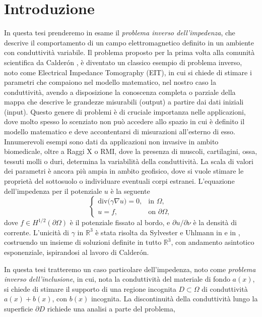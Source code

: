 \documentclass[10pt, a4paper, twoside, openright]{book}
\theoremstyle{definition}
\theoremstyle{plain}
\theoremstyle{plain}
\theoremstyle{plain}
\theoremstyle{plain}
\theoremstyle{plain}
\theoremstyle{plain}
\theoremstyle{plain}
\theoremstyle{plain}
\begin{document}
\chapter*{Introduzione}
In questa tesi prenderemo in esame il \emph{problema inverso dell'impedenza}, 
che descrive il comportamento di un campo elettromagnetico definito in un 
ambiente con conduttività variabile.
Il problema proposto per la prima volta alla comunità scientifica da 
Calder\'on \cite{Ca}, è diventato un classico esempio di problema inverso, 
noto come Electrical Impedance Tomography (EIT),
in cui si chiede di stimare i parametri che compaiono nel modello matematico, 
nel nostro caso la conduttività, avendo a disposizione la conoscenza completa 
o parziale della mappa che descrive le grandezze misurabili (output) a partire dai 
dati iniziali (input).
Questo genere di problemi è di cruciale importanza nelle applicazioni, dove
molto spesso lo scenziato non può accedere allo spazio in cui è definito il modello 
matematico e deve accontentarsi di misurazioni all'esterno di esso. 
Innumerevoli esempi sono dati da applicazioni non invasive in ambito biomedicale, 
oltre a Raggi X o RMI, 
dove la presenza di muscoli, cartilagini, ossa, tessuti molli o duri, determina 
la variabilità della conduttività. La scala di valori dei parametri è ancora 
più ampia in ambito geofisico, dove si vuole stimare le proprietà del 
sottosuolo o individuare eventuali corpi estranei.
L'equazione dell'impedenza per il potenziale $u$ è la seguente
$$\left\{\begin{array}{ll}
\mathrm{div}\big(\gamma\nabla u\big)=0, & \textrm{in }\Omega,\\
u=f, & \textrm{on }\partial\Omega,
\end{array}\right.$$
dove $f\in H^{1/2}(\partial \Omega)$ è il potenziale fissato al bordo, e 
$\partial u/\partial \nu$ è la densità di corrente.
L'unicità di $\gamma$ in $\mathbb{R}^3$ è stata risolta da Sylvester e Uhlmann 
in \cite{Sy-Uh} e in \cite{Sy-Uh86}, costruendo un insieme di soluzioni definite in 
tutto $\mathbb{R}^3$, con andamento asintotico esponenziale, ispirandosi al lavoro 
di Calder\'on.
\par
In questa tesi tratteremo un caso particolare dell'impedenza, noto come \emph{problema inverso 
dell'inclusione}, in cui, nota la conduttività del materiale di fondo $a(x)$, si chiede di 
stimare il supporto di una regione incognita $D\subset \Omega$ di conduttività $a(x) + b(x)$, 
con $b(x)$ incognita. La discontinuità della conduttività lungo la superficie $\partial D$ 
richiede una analisi a parte del problema, 
\end{document}
